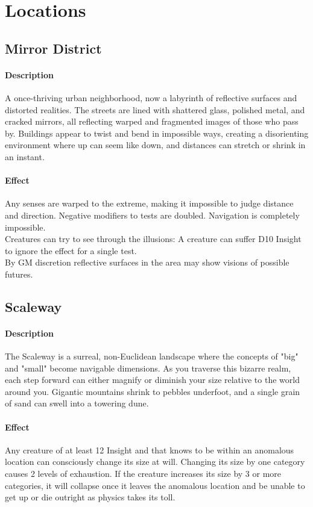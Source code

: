 \section{Locations}
\subsection*{Mirror District}
\paragraph{Description}
A once-thriving urban neighborhood,
	now a labyrinth of reflective surfaces and distorted realities.
The streets are lined with shattered glass, polished metal, and cracked mirrors,
	all reflecting warped and fragmented images of those who pass by.
Buildings appear to twist and bend in impossible ways,
	creating a disorienting environment where up can seem like down,
	and distances can stretch or shrink in an instant.
\paragraph{Effect}
Any senses are warped to the extreme,
	making it impossible to judge distance and direction.
Negative modifiers to tests are doubled.
Navigation is completely impossible.
\\%
Creatures can try to see through the illusions:
A creature can suffer D10 Insight to ignore the effect for a single test.
\\%
By GM discretion reflective surfaces in the area may show visions of possible futures.
\subsection*{Scaleway}
\paragraph{Description}
The Scaleway is a surreal, non-Euclidean landscape
	where the concepts of "big" and "small" become navigable dimensions.
As you traverse this bizarre realm,
	each step forward can either magnify or diminish your size
	relative to the world around you.
Gigantic mountains shrink to pebbles underfoot,
	and a single grain of sand can swell into a towering dune. 
\paragraph{Effect}
Any creature of at least 12 Insight
	and that knows to be within an anomalous location
	can consciously change its size at will.
Changing its size by one category causes 2 levels of exhaustion.
If the creature increases its size by 3 or more categories,
	it will collapse once it leaves the anomalous location
	and be unable to get up or die outright
	as physics takes its toll.

